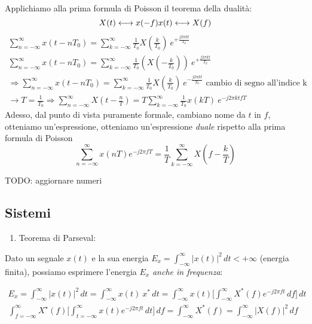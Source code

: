 \documentclass[
  paper=a4,
  ,captions=tableheading
]{scrartcl}
\providecommand{\tightlist}{%
  \setlength{\itemsep}{0pt}\setlength{\parskip}{0pt}}
\begin{document}
\begin{enumerate}
  Applichiamo alla prima formula di Poisson il teorema della dualità: \[
  X(t) \longleftrightarrow x(-f) \\
  x(t) \longleftrightarrow X(f)
  \] \begin{gather*}
  \sum_{n=-\infty}^{\infty}x(t-nT_0) = \sum_{k=-\infty}^{\infty} \frac{1}{T_0} X(\frac{k}{T_0})\ e^{+\frac{j2\pi kt}{T_0}} \\
  \sum_{n=-\infty}^{\infty}x(t-nT_0) = \sum_{k=-\infty}^{\infty} \frac{1}{T_0}(X(-\frac{k}{T_0}))\ e^{+\frac{j2\pi kt}{T_0}} \\
  \Rightarrow \sum_{n=-\infty}^{\infty}x(t-nT_0) = \sum_{k=-\infty}^{\infty} \frac{1}{T_0} X(\frac{k}{T_0})\ e^{-\frac{j2\pi kt}{T_0}} \text{ cambio di segno all'indice k} \\
  \to T = \frac{1}{T_0} \Rightarrow \sum_{n=-\infty}^{\infty}X(t-\frac{n}{T}) = T\sum_{k=-\infty}^{\infty} \frac{1}{T_0} x(kT)\ e^{-j2\pi ktfT}
  \end{gather*} Adesso, dal punto di vista puramente formale, cambiano
  nome da \(t\) in \(f\), otteniamo un'espressione, otteniamo
  un'espressione \emph{duale} rispetto alla prima formula di Poisson \[
  \sum_{n=-\infty}^{\infty}x(nT)e^{-j2\pi fT} = \frac{1}{T}\sum_{k=-\infty}^{\infty}X(f-\frac{k}{T})
  \]
\end{enumerate}

TODO: aggiornare numeri

\subsection{Sistemi}\label{sistemi}

\begin{enumerate}
\def\labelenumi{\arabic{enumi}.}
\tightlist
\item
  Teorema di Parseval:
\end{enumerate}

Dato un segnale \(x(t)\) e la sua energia
\(E_{x}=\int_{-\infty}^{\infty} |x(t)|^2 \,dt < +\infty\) (energia
finita), possiamo esprimere l'energia \(E_x\) \emph{anche in frequenza}:

\begin{gather*}
E_{x}=\int_{-\infty}^{\infty} |x(t)|^2 \,dt = \int_{-\infty}^{\infty} x(t) \ x^{\ast} \,dt = \int_{-\infty}^{\infty} x(t) \Big[ \int_{-\infty}^{\infty} X^{*}(f) e^{-j2\pi ft} \,df \Big] \,dt \\
\int_{f=-\infty}^{\infty} X^{\star}(f) \Big [\int_{t=-\infty}^{\infty} x(t) e^{-j2\pi ft} \,dt\Big ] \,df = \int_{-\infty}^{\infty} X^{*}(f) = \int_{-\infty}^{\infty} |X(f)|^{2} \,df
\end{gather*}
\end{document}
